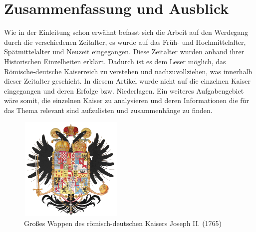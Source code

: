 
\chapter{Zusammenfassung und Ausblick}
\label{chapter-fazit}

Wie in der Einleitung schon erwähnt befasst sich die Arbeit auf den Werdegang durch die verschiedenen Zeitalter, es wurde auf das Früh- und Hochmittelalter, Spätmittelalter und Neuzeit eingegangen. Diese Zeitalter wurden anhand ihrer Historischen Einzelheiten erklärt. Dadurch ist es dem Leser möglich, das Römische-deutsche Kaiserreich zu verstehen und nachzuvollziehen, was innerhalb dieser Zeitalter geschieht.
In diesem Artikel wurde nicht auf die einzelnen Kaiser eingegangen und deren Erfolge bzw. Niederlagen. Ein weiteres Aufgabengebiet wäre somit, die einzelnen Kaiser zu analysieren und deren Informationen die für das Thema relevant sind aufzulisten und zusammenhänge zu finden.
\cite{Schulze}
\begin{figure}[H]
\centering
\includegraphics[width = 5cm, height= 5cm]{GrossesWappen.png}
\caption{Großes Wappen des römisch-deutschen Kaisers Joseph II. (1765)}
\end{figure}